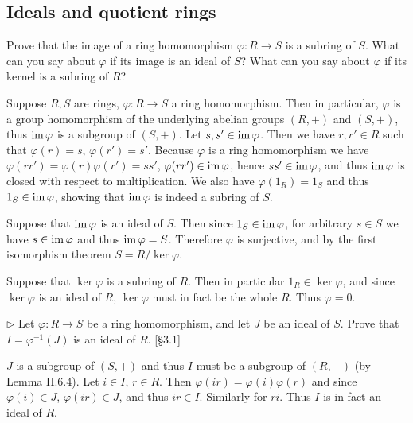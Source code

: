 \subsection{Ideals and quotient rings}

\begin{problem}
	Prove that the image of a ring homomorphism $\varphi: R \to S$ is a subring of $S$. What can you say about $\varphi$ if its image is an ideal of $S$? What can you say about $\varphi$ if its kernel is a subring of $R$?
\end{problem}

\begin{solution}
	Suppose $R, S$ are rings, $\varphi: R \to S$ a ring homomorphism. Then in particular, $\varphi$ is a group homomorphism of the underlying abelian groups $(R, +)$ and $(S, +)$, thus $\operatorname{im} \varphi$ is a subgroup of $(S, +)$. Let $s, s' \in \operatorname{im} \varphi$. Then we have $r, r' \in R$ such that $\varphi(r) = s$, $\varphi(r') = s'$. Because $\varphi$ is a ring homomorphism we have $\varphi(rr') = \varphi(r)\varphi(r') = ss'$, $\varphi(rr') \in \operatorname{im} \varphi$, hence $ss' \in \operatorname{im} \varphi$, and thus $\operatorname{im} \varphi$ is closed with respect to multiplication. We also have $\varphi(1_R) = 1_S$ and thus $1_S \in \operatorname{im} \varphi$, showing that $\operatorname{im} \varphi$ is indeed a subring of $S$.

	Suppose that $\operatorname{im} \varphi$ is an ideal of $S$. Then since $1_S \in \operatorname{im} \varphi$, for arbitrary $s \in S$ we have $s \in \operatorname{im} \varphi$ and thus $\operatorname{im} \varphi = S$. Therefore $\varphi$ is surjective, and by the first isomorphism theorem $S = R/\ker \varphi$.
	
	Suppose that $\ker \varphi$ is a subring of $R$. Then in particular $1_R \in \ker \varphi$, and since $\ker \varphi$ is an ideal of $R$, $\ker \varphi$ must in fact be the whole $R$. Thus $\varphi = 0$.
\end{solution}

\begin{problem}
	$\triangleright$ Let $\varphi: R \to S$ be a ring homomorphism, and let $J$ be an ideal of $S$. Prove that $I = \varphi^{-1}(J)$ is an ideal of $R$. [\S 3.1]
\end{problem}

\begin{solution}
	$J$ is a subgroup of $(S, +)$ and thus $I$ must be a subgroup of $(R, +)$ (by Lemma II.6.4). Let $i \in I$, $r \in R$. Then $\varphi(ir) = \varphi(i)\varphi(r)$ and since $\varphi(i) \in J$, $\varphi(ir) \in J$, and thus $ir \in I$. Similarly for $ri$. Thus $I$ is in fact an ideal of $R$.
\end{solution}

